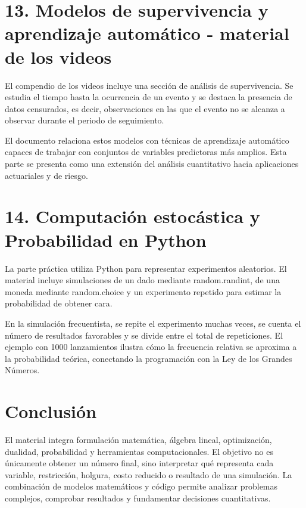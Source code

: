 \documentclass[11pt]{article}
\begin{document}
\section*{13. Modelos de supervivencia y aprendizaje automático - material de los videos}
El compendio de los videos incluye una sección de análisis de supervivencia. Se estudia el tiempo hasta la ocurrencia de un evento y se destaca la presencia de datos censurados, es decir, observaciones en las que el evento no se alcanza a observar durante el periodo de seguimiento.

El documento relaciona estos modelos con técnicas de aprendizaje automático capaces de trabajar con conjuntos de variables predictoras más amplios. Esta parte se presenta como una extensión del análisis cuantitativo hacia aplicaciones actuariales y de riesgo.


\section*{14. Computación estocástica y Probabilidad en Python}
La parte práctica utiliza Python para representar experimentos aleatorios. El material incluye simulaciones de un dado mediante random.randint, de una moneda mediante random.choice y un experimento repetido para estimar la probabilidad de obtener cara.

En la simulación frecuentista, se repite el experimento muchas veces, se cuenta el número de resultados favorables y se divide entre el total de repeticiones. El ejemplo con 1000 lanzamientos ilustra cómo la frecuencia relativa se aproxima a la probabilidad teórica, conectando la programación con la Ley de los Grandes Números.


\section*{Conclusión}
El material integra formulación matemática, álgebra lineal, optimización, dualidad, probabilidad y herramientas computacionales. El objetivo no es únicamente obtener un número final, sino interpretar qué representa cada variable, restricción, holgura, costo reducido o resultado de una simulación. La combinación de modelos matemáticos y código permite analizar problemas complejos, comprobar resultados y fundamentar decisiones cuantitativas.
\end{document}
